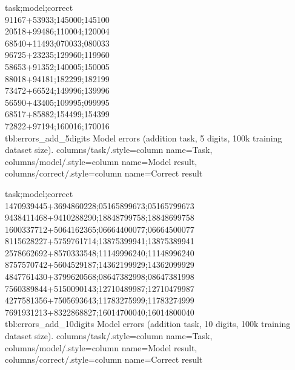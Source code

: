 
{
	task;model;correct\\
	91167+53933;145000;145100\\
	20518+99486;110004;120004\\
	68540+11493;070033;080033\\
	96725+23235;129960;119960\\
	58653+91352;140005;150005\\
	88018+94181;182299;182199\\
	73472+66524;149996;139996\\
	56590+43405;109995;099995\\
	68517+85882;154499;154399\\
	72822+97194;160016;170016\\
}
{tbl:errors_add_5digits}
{
	Model errors (addition task, 5 digits, 100k training dataset size).
}
{
	columns/task/.style={column name={Task}},
	columns/model/.style={column name={Model result}},
	columns/correct/.style={column name={Correct result}}
}

{
	task;model;correct\\
	1470939445+3694860228;05165899673;05165799673\\
	9438411468+9410288290;18848799758;18848699758\\
	1600337712+5064162365;06664400077;06664500077\\
	8115628227+5759761714;13875399941;13875389941\\
	2578662692+8570333548;11149996240;11148996240\\
	8757570742+5604529187;14362199929;14362099929\\
	4847761430+3799620568;08647382998;08647381998\\
	7560389844+5150090143;12710489987;12710479987\\
	4277581356+7505693643;11783275999;11783274999\\
	7691931213+8322868827;16014700040;16014800040\\
}
{tbl:errors_add_10digits}
{
	Model errors (addition task, 10 digits, 100k training dataset size).
}
{
	columns/task/.style={column name={Task}},
	columns/model/.style={column name={Model result}},
	columns/correct/.style={column name={Correct result}}
}


